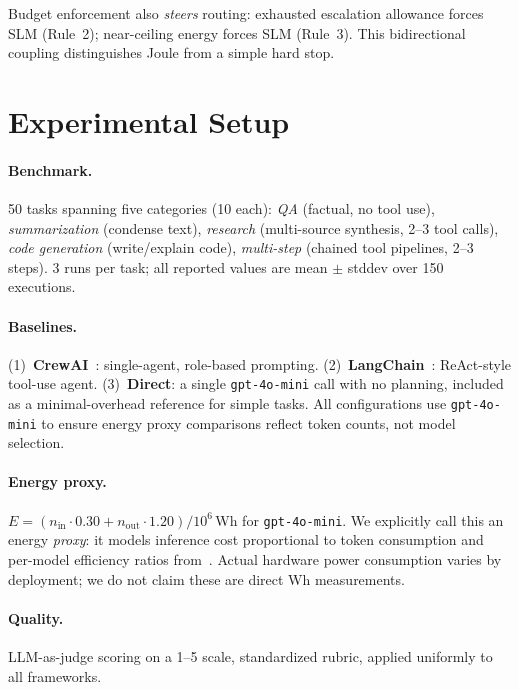 \documentclass[sigconf,authordraft]{acmart}
\begin{document}
\noindent Budget enforcement also \emph{steers} routing: exhausted escalation allowance forces SLM (Rule~2); near-ceiling energy forces SLM (Rule~3).
This bidirectional coupling distinguishes Joule from a simple hard stop.

\section{Experimental Setup}
\label{sec:setup}

\paragraph{Benchmark.}
50 tasks spanning five categories (10 each):
\emph{QA} (factual, no tool use), \emph{summarization} (condense text),
\emph{research} (multi-source synthesis, 2--3 tool calls),
\emph{code generation} (write/explain code),
\emph{multi-step} (chained tool pipelines, 2--3 steps).
3 runs per task; all reported values are mean $\pm$ stddev over 150 executions.

\paragraph{Baselines.}
(1)~\textbf{CrewAI}~\cite{crewai}: single-agent, role-based prompting.
(2)~\textbf{LangChain}~\cite{langchain}: ReAct-style tool-use agent.
(3)~\textbf{Direct}: a single \texttt{gpt-4o-mini} call with no planning, included as a minimal-overhead reference for simple tasks.
All configurations use \texttt{gpt-4o-mini} to ensure energy proxy comparisons reflect token counts, not model selection.

\paragraph{Energy proxy.}
$E = (n_{\text{in}} \cdot 0.30 + n_{\text{out}} \cdot 1.20) / 10^6$\,Wh for \texttt{gpt-4o-mini}.
We explicitly call this an energy \emph{proxy}: it models inference cost proportional to token consumption and per-model efficiency ratios from~\cite{luccioni2023power}.
Actual hardware power consumption varies by deployment; we do not claim these are direct Wh measurements.

\paragraph{Quality.}
LLM-as-judge scoring on a 1--5 scale, standardized rubric, applied uniformly to all frameworks.
\end{document}
